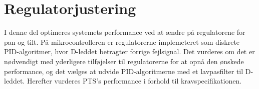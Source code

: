 \part{Regulatorjustering}
I denne del optimeres systemets performance ved at ændre på regulatorene for pan og tilt. 
På mikrocontrolleren er regulatorerne implemeteret som diskrete PID-algoritmer,
hvor D-leddet betragter forrige fejlsignal.
Det vurderes om det er nødvendigt med yderligere tilføjelser til regulatorerne 
for at opnå den ønskede performance, og det vælges at udvide PID-algoritmerne med et lavpasfilter til D-leddet.
Herefter vurderes PTS's performance i forhold til kravspecifikationen.

%
